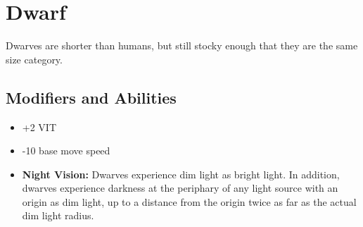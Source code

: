 \section{Dwarf}\label{dwarf}
Dwarves are shorter than humans, but still stocky enough that they are the same
size category.

\subsection*{Modifiers and Abilities}
\begin{itemize}
    \item +2 VIT
    \item -10 base move speed
    \item \textbf{Night Vision:} Dwarves experience dim light as bright light.
        In addition, dwarves experience darkness at the periphary of any
        light source with an origin as dim light, up to a distance from the
        origin twice as far as the actual dim light radius.
\end{itemize}
